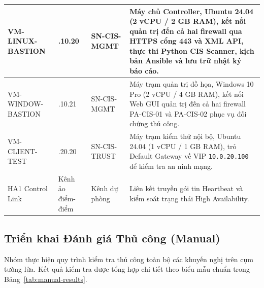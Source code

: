 \documentclass[12pt,a4paper]{article}
\begin{document}
\begin{table}[H]
\begin{tabular}{|>{\raggedright\arraybackslash}p{2.8cm}|>{\raggedright\arraybackslash}p{3.2cm}|>{\raggedright\arraybackslash}p{2.6cm}|>{\raggedright\arraybackslash}p{6.4cm}|}
VM-LINUX-BASTION & 10.0.10.20 & SN-CIS-MGMT & Máy chủ Controller, Ubuntu 24.04 (2 vCPU / 2 GB RAM), kết nối quản trị đến cả hai firewall qua HTTPS cổng 443 và XML API, thực thi Python CIS Scanner, kịch bản Ansible và lưu trữ nhật ký báo cáo. \\ \hline
VM-WINDOW-BASTION & 10.0.10.21 & SN-CIS-MGMT & Máy trạm quản trị đồ họa, Windows 10 Pro (2 vCPU / 4 GB RAM), kết nối Web GUI quản trị đến cả hai firewall PA-CIS-01 và PA-CIS-02 phục vụ đối chứng thủ công. \\ \hline
VM-CLIENT-TEST & 10.0.20.20 & SN-CIS-TRUST & Máy trạm kiểm thử nội bộ, Ubuntu 24.04 (1 vCPU / 1 GB RAM), trỏ Default Gateway về VIP \texttt{10.0.20.100} để kiểm tra an ninh mạng. \\ \hline
HA1 Control Link & Kênh ảo điểm-điểm & Kênh dự phòng & Liên kết truyền gói tin Heartbeat và kiểm soát trạng thái High Availability. \\ \hline
\end{tabular}
\endgroup
\end{table}

\subsection{Triển khai Đánh giá Thủ công (Manual)}

Nhóm thực hiện quy trình kiểm tra thủ công toàn bộ các khuyến nghị trên cụm tường lửa. Kết quả kiểm tra được tổng hợp chi tiết theo biểu mẫu chuẩn trong Bảng~\ref{tab:manual-results}.
\end{document}
